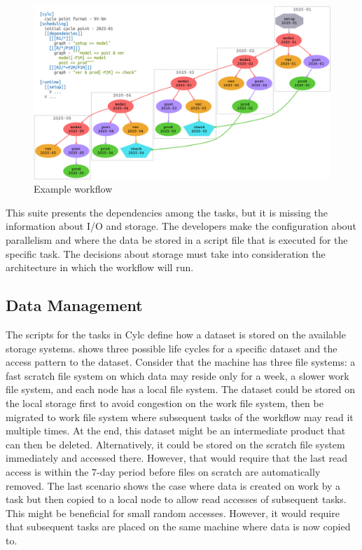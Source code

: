 \documentclass[a4paper]{article}
\begin{document}
{{\begin{figure}[H]
  \centering
  \includegraphics[width=0.9\columnwidth]{cylc}
  \caption{Example workflow\cite{TODO}}
  \label{fig:cylc}
\end{figure}

This suite presents the dependencies among the tasks, but it is missing the information about I/O and storage.
The developers make the configuration about parallelism and where the data be stored in a script file that is executed for the specific task.
The decisions about storage must take into consideration the architecture in which the workflow will run.

\subsection{Data Management}

The scripts for the tasks in Cylc define how a dataset is stored on the available storage systems.
 shows three possible life cycles for a specific dataset and the access pattern to the dataset.
Consider that the machine has three file systems: a fast scratch file system on which data may reside only for a week, a slower work file system, and each node has a local file system.
The dataset could be stored on the local storage first to avoid congestion on the work file system, then be migrated to work file system where subsequent tasks of the workflow may read it multiple times.
At the end, this dataset might be an intermediate product that can then be deleted.
Alternatively, it could be stored on the scratch file system immediately and accessed there.
However, that would require that the last read access is within the 7-day period before files on scratch are automatically removed.
The last scenario shows the case where data is created on work by a task but then copied to a local node to allow read accesses of subsequent tasks.
This might be beneficial for small random accesses.
However, it would require that subsequent tasks are placed on the same machine where data is now copied to.

}}
\end{document}
